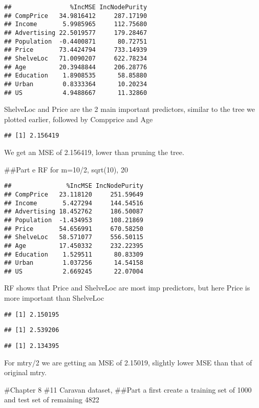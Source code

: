 \documentclass[
]{article}
\begin{document}
\begin{verbatim}
##                %IncMSE IncNodePurity
## CompPrice   34.9816412     287.17190
## Income       5.9985965     112.75680
## Advertising 22.5019577     179.28467
## Population  -0.4400871      80.72751
## Price       73.4424794     733.14939
## ShelveLoc   71.0090207     622.78234
## Age         20.3948844     206.28776
## Education    1.8908535      58.85880
## Urban        0.8333364      10.20234
## US           4.9488667      11.32860
\end{verbatim}

ShelveLoc and Price are the 2 main important predictors, similar to the
tree we plotted earlier, followed by Compprice and Age

\begin{verbatim}
## [1] 2.156419
\end{verbatim}

We get an MSE of 2.156419, lower than pruning the tree.

\#\#Part e RF for m=10/2, sqrt(10), 20

\begin{verbatim}
##               %IncMSE IncNodePurity
## CompPrice   23.118120     251.59649
## Income       5.427294     144.54516
## Advertising 18.452762     186.50087
## Population  -1.434953     108.21869
## Price       54.656991     670.58250
## ShelveLoc   58.571077     556.50115
## Age         17.450332     232.22395
## Education    1.529511      80.83309
## Urban        1.037256      14.54158
## US           2.669245      22.07004
\end{verbatim}

RF shows that Price and ShelveLoc are most imp predictors, but here
Price is more important than ShelveLoc

\begin{verbatim}
## [1] 2.150195
\end{verbatim}

\begin{verbatim}
## [1] 2.539206
\end{verbatim}

\begin{verbatim}
## [1] 2.134395
\end{verbatim}

For mtry/2 we are getting an MSE of 2.15019, slightly lower MSE than
that of original mtry.

\#Chapter 8 \#11 Caravan dataset, \#\#Part a first create a training set
of 1000 and test set of remaining 4822
\end{document}
